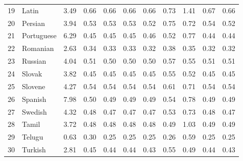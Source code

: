 \documentclass[a4paper]{article}
\begin{document}
\begin{table}
\begin{tabular}{rlrrrrrrrrr}
  19 & Latin & 3.49 & 0.66 & 0.66 & 0.66 & 0.66 & 0.73 & 1.41 & 0.67 & 0.66 \\ 
  20 & Persian & 3.94 & 0.53 & 0.53 & 0.53 & 0.52 & 0.75 & 0.72 & 0.54 & 0.52 \\ 
  21 & Portuguese & 6.29 & 0.45 & 0.45 & 0.45 & 0.46 & 0.52 & 0.77 & 0.44 & 0.44 \\ 
  22 & Romanian & 2.63 & 0.34 & 0.33 & 0.33 & 0.32 & 0.38 & 0.35 & 0.32 & 0.32 \\ 
  23 & Russian & 4.04 & 0.51 & 0.50 & 0.50 & 0.50 & 0.57 & 0.55 & 0.51 & 0.51 \\ 
  24 & Slovak & 3.82 & 0.45 & 0.45 & 0.45 & 0.45 & 0.55 & 0.52 & 0.45 & 0.45 \\ 
  25 & Slovene & 4.27 & 0.54 & 0.54 & 0.54 & 0.54 & 0.61 & 0.71 & 0.54 & 0.54 \\ 
  26 & Spanish & 7.98 & 0.50 & 0.49 & 0.49 & 0.49 & 0.54 & 0.78 & 0.49 & 0.49 \\ 
  27 & Swedish & 4.32 & 0.48 & 0.47 & 0.47 & 0.47 & 0.53 & 0.73 & 0.48 & 0.47 \\ 
  28 & Tamil & 3.72 & 0.48 & 0.48 & 0.48 & 0.48 & 0.49 & 1.03 & 0.49 & 0.49 \\ 
  29 & Telugu & 0.63 & 0.30 & 0.25 & 0.25 & 0.25 & 0.26 & 0.59 & 0.25 & 0.25 \\ 
  30 & Turkish & 2.81 & 0.45 & 0.44 & 0.44 & 0.43 & 0.55 & 0.49 & 0.44 & 0.43 \\ 
   \hline
\end{tabular}
\end{table}
\pagestyle{plain}





\end{document}
